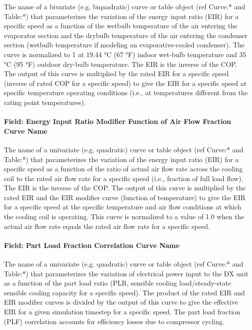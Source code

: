 The name of a bivariate (e.g. biquadratic) curve or table object (ref Curve:* and Table:*) that parameterizes the variation of the energy input ratio (EIR) for a specific speed as a function of the wetbulb temperature of the air entering the evaporator section and the drybulb temperature of the air entering the condenser section (wetbulb temperature if modeling an evaporative-cooled condenser). The curve is normalized to 1 at 19.44 °C (67 °F) indoor wet-bulb temperature and 35 °C (95 °F) outdoor dry-bulb temperature. The EIR is the inverse of the COP. The output of this curve is multiplied by the rated EIR for a specific speed (inverse of rated COP for a specific speed) to give the EIR for a specific speed at specific temperature operating conditions (i.e., at temperatures different from the rating point temperatures).

\paragraph{Field: Energy Input Ratio Modifier Function of Air Flow Fraction Curve Name}\label{field-energy-input-ratio-function-of-air-flow-fraction-curve-name}

The name of a univariate (e.g. quadratic) curve or table object (ref Curve:* and Table:*) that parameterizes the variation of the energy input ratio (EIR) for a specific speed as a function of the ratio of actual air flow rate across the cooling coil to the rated air flow rate for a specific speed (i.e., fraction of full load flow). The EIR is the inverse of the COP. The output of this curve is multiplied by the rated EIR and the EIR modifier curve (function of temperature) to give the EIR for a specific speed at the specific temperature and air flow conditions at which the cooling coil is operating. This curve is normalized to a value of 1.0 when the actual air flow rate equals the rated air flow rate for a specific speed.

\paragraph{Field: Part Load Fraction Correlation Curve Name}\label{field-part-load-fraction-correlation-curve-name}

The name of a univariate (e.g. quadratic) curve or table object (ref Curve:* and Table:*) that parameterizes the variation of electrical power input to the DX unit as a function of the part load ratio (PLR, sensible cooling load/steady-state sensible cooling capacity for a specific speed). The product of the rated EIR and EIR modifier curves is divided by the output of this curve to give the effective EIR for a given simulation timestep for a specific speed. The part load fraction (PLF) correlation accounts for efficiency losses due to compressor cycling.

